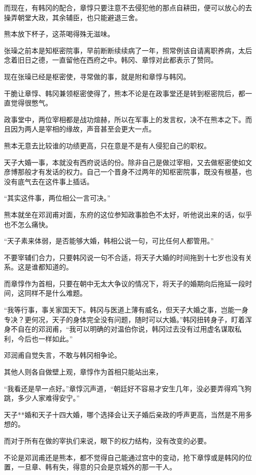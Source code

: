 而现在，有韩冈的配合，章惇只要注意不去侵犯他的那点自耕田，便可以放心的去操弄朝堂大政，其余辅臣，也只能避退三舍。

熊本放下杯子，这茶喝得殊无滋味。

张璪之前本是知枢密院事，早前断断续续病了一年，照常例该自请离职养病，太后念着旧日之德，一直留他在西府之中。韩冈、章惇对此都表示了赞同。

现在张璪已经是枢密使，寻常做的事，就是附和章惇与韩冈。

干脆让章惇、韩冈兼领枢密使得了，熊本不论是在政事堂还是转到枢密院后，都一直觉得很憋气。

政事堂中，两位宰相都是战功煊赫，所以在军事上的发言权，决不在熊本之下。而且因为两人是宰相的缘故，声音甚至会更大一点。

熊本无意去比较谁的功绩更高，只在意是不是有人侵犯自己的职权。

天子大婚一事，本就没有西府说话的份。除非自己是做过宰相，又去做枢密使如文彦博那般才有发话的权力。自己一个晋身不过两年的知枢密院事，既没有根基，也没有底气去在这件事上插话。

“其实这件事，两位相公一言可决。”

熊本就坐在邓润甫对面，东府的这位参知政事脸色不太好，听他说出来的话，似乎也不怎么痛快。

“天子素来体弱，是否能够大婚，韩相公说一句，可比任何人都管用。”

不要宰辅们合力，只要韩冈说一句不合适，将天子大婚的时间拖到十七岁也没有关系。这是谁都知道的。

而章惇作为首相，只要在朝中无太大争议的情况下，将天子的婚期向后拖延一段时间，这同样不是什么难题。

“我等行事，事关家国天下。韩冈与医道上薄有威名，但天子大婚之事，岂能一身专决？更何况，天子的身体完全没有问题，随时可以大婚。”韩冈扭转身子，盯着浑身不自在的邓润甫，“我可以明确的对温伯你说，韩冈过去没有过用虚名谋取私利，今后也一样如此。”

邓润甫自觉失言，不敢与韩冈相争论。

其他人则各自做壁上观，章惇作为首相只能站出来，

“我看还是早一点好。”章惇沉声道，“朝廷好不容易才安生几年，没必要弄得鸡飞狗跳，多少人家难得安宁。”

天子**婚和天子十四大婚，哪个选择会让天子婚后亲政的呼声更高，当然是不用多想的。

而对于所有在做的宰执们来说，眼下的权力结构，没有改变的必要。

不论是邓润甫还是熊本，都不觉得自己能通过宫中的变动，抢下章惇或是韩冈的位置，一旦章、韩有失，得意的只会是京城外的那一干人。

